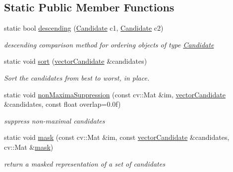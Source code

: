 \subsection*{\-Static \-Public \-Member \-Functions}
\begin{DoxyCompactItemize}
\item 
static bool \hyperlink{classCandidate_a3bd4b38f5afddfa676e03121b135780c}{descending} (\hyperlink{classCandidate}{\-Candidate} c1, \hyperlink{classCandidate}{\-Candidate} c2)
\begin{DoxyCompactList}\small\item\em descending comparison method for ordering objects of type \hyperlink{classCandidate}{\-Candidate} \end{DoxyCompactList}\item 
static void \hyperlink{classCandidate_a7e0776d9b8b7496d49f46298e93d0271}{sort} (\hyperlink{types_8hpp_a04eefdf70d6c6b8effb5170271f1db05}{vector\-Candidate} \&candidates)
\begin{DoxyCompactList}\small\item\em \-Sort the candidates from best to worst, in place. \end{DoxyCompactList}\item 
static void \hyperlink{classCandidate_af2765b794cd31148d3a6b40bbc4d733f}{non\-Maxima\-Suppression} (const cv\-::\-Mat \&im, \hyperlink{types_8hpp_a04eefdf70d6c6b8effb5170271f1db05}{vector\-Candidate} \&candidates, const float overlap=0.\-0f)
\begin{DoxyCompactList}\small\item\em suppress non-\/maximal candidates \end{DoxyCompactList}\item 
static void \hyperlink{classCandidate_ac68a19185a7bcb0d0076af9634d63407}{mask} (const cv\-::\-Mat \&im, const \hyperlink{types_8hpp_a04eefdf70d6c6b8effb5170271f1db05}{vector\-Candidate} \&candidates, cv\-::\-Mat \&\hyperlink{classCandidate_ac68a19185a7bcb0d0076af9634d63407}{mask})
\begin{DoxyCompactList}\small\item\em return a masked representation of a set of candidates \end{DoxyCompactList}\end{DoxyCompactItemize}
